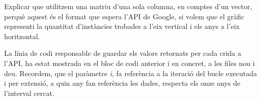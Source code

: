 Explicar que utilitzem una matriu d'una sola columna, en comptes d'un vector, perquè aquest és el format que espera l'API de Google, si volem que el gràfic representi la quantitat d'instàncies trobades a l'eix vertical i els anys a l'eix horitzontal.

La línia de codi responsable de guardar els valors retornats per cada crida a l’API, ha estat mostrada en el bloc de codi anterior i en concret, a les files nou i deu. Recordem, que el paràmetre \emph{i}, fa referència a la iteració del bucle executada i per extensió, a quin any fan referència les dades, respecta els onze anys de l’interval cercat.

